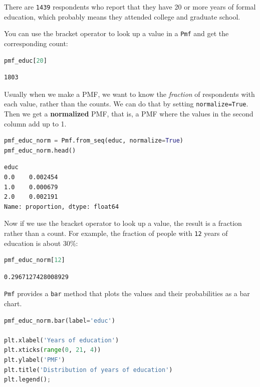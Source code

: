 There are \passthrough{\lstinline!1439!} respondents who report that
they have 20 or more years of formal education, which probably means
they attended college and graduate school.

You can use the bracket operator to look up a value in a
\passthrough{\lstinline!Pmf!} and get the corresponding count:

\begin{lstlisting}[language=Python,style=source]
pmf_educ[20]
\end{lstlisting}

\begin{lstlisting}[style=output]
1803
\end{lstlisting}

Usually when we make a PMF, we want to know the \emph{fraction} of
respondents with each value, rather than the counts. We can do that by
setting \passthrough{\lstinline!normalize=True!}. Then we get a
\textbf{normalized} PMF, that is, a PMF where the values in the second
column add up to 1.

\begin{lstlisting}[language=Python,style=source]
pmf_educ_norm = Pmf.from_seq(educ, normalize=True)
pmf_educ_norm.head()
\end{lstlisting}

\begin{lstlisting}[style=output]
educ
0.0    0.002454
1.0    0.000679
2.0    0.002191
Name: proportion, dtype: float64
\end{lstlisting}

Now if we use the bracket operator to look up a value, the result is a
fraction rather than a count. For example, the fraction of people with
\passthrough{\lstinline!12!} years of education is about \(30\%\):

\begin{lstlisting}[language=Python,style=source]
pmf_educ_norm[12]
\end{lstlisting}

\begin{lstlisting}[style=output]
0.2967127428008929
\end{lstlisting}

\passthrough{\lstinline!Pmf!} provides a \passthrough{\lstinline!bar!}
method that plots the values and their probabilities as a bar chart.

\begin{lstlisting}[language=Python,style=source]
pmf_educ_norm.bar(label='educ')

plt.xlabel('Years of education')
plt.xticks(range(0, 21, 4))
plt.ylabel('PMF')
plt.title('Distribution of years of education')
plt.legend();
\end{lstlisting}

